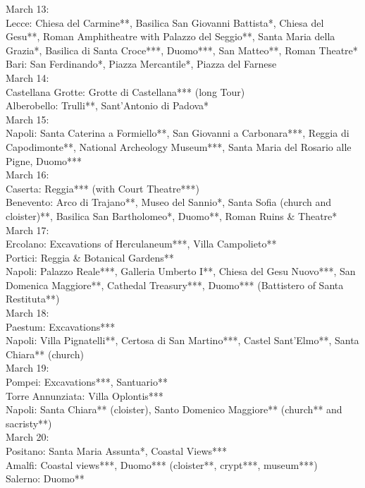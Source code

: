 March 13:\\
Lecce: Chiesa del Carmine**, Basilica San Giovanni Battista*, Chiesa del Gesu**, Roman Amphitheatre with Palazzo del Seggio**, Santa Maria della Grazia*, Basilica di Santa Croce***, Duomo***, San Matteo**, Roman Theatre*\\
Bari: San Ferdinando*, Piazza Mercantile*, Piazza del Farnese\\

March 14:\\
Castellana Grotte: Grotte di Castellana*** (long Tour)\\
Alberobello: Trulli**, Sant'Antonio di Padova*\\

March 15:\\
Napoli: Santa Caterina a Formiello**, San Giovanni a Carbonara***, Reggia di Capodimonte**, National Archeology Museum***, Santa Maria del Rosario alle Pigne, Duomo***\\

March 16:\\
Caserta: Reggia*** (with Court Theatre***)\\
Benevento: Arco di Trajano**, Museo del Sannio*, Santa Sofia (church and cloister)**, Basilica San Bartholomeo*, Duomo**, Roman Ruins \& Theatre*\\

March 17:\\
Ercolano: Excavations of Herculaneum***, Villa Campolieto**\\
Portici: Reggia \& Botanical Gardens**\\
Napoli: Palazzo Reale***, Galleria Umberto I**, Chiesa del Gesu Nuovo***, San Domenica Maggiore**, Cathedal Treasury***, Duomo*** (Battistero of Santa Restituta**)\\

March 18:\\
Paestum: Excavations***\\
Napoli: Villa Pignatelli**, Certosa di San Martino***, Castel Sant'Elmo**, Santa Chiara** (church)\\

March 19:\\
Pompei: Excavations***, Santuario**\\
Torre Annunziata: Villa Oplontis***\\
Napoli: Santa Chiara** (cloister), Santo Domenico Maggiore** (church** and sacristy**)\\

March 20:\\
Positano: Santa Maria Assunta*, Coastal Views***\\
Amalfi: Coastal views***, Duomo*** (cloister**, crypt***, museum***)\\
Salerno: Duomo**\\

